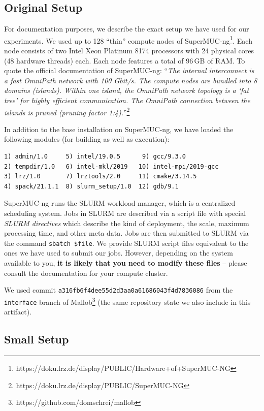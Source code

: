 \documentclass[runningheads]{article}
\numberwithin{dummy}{subsection}
\begin{document}
\subsection{Original Setup}

For documentation purposes, we describe the exact setup we have used for our experiments.
We used up to 128 ``thin'' compute nodes of SuperMUC-ng\footnote{https://doku.lrz.de/display/PUBLIC/Hardware+of+SuperMUC-NG}.
Each node consists of two Intel Xeon Platinum 8174 processors with 24 physical cores (48 hardware threads) each.
Each node features a total of 96\,GB of RAM.
To quote the official documentation of SuperMUC-ng: ``\textit{The internal interconnect is a fast OmniPath network with 100 Gbit/s.
The compute nodes are bundled into 8 domains (islands). Within one island, the OmniPath network topology is a `fat tree' for highly efficient communication. The OmniPath connection between the islands is pruned (pruning factor 1:4).}''\footnote{https://doku.lrz.de/display/PUBLIC/SuperMUC-NG}

In addition to the base installation on SuperMUC-ng, we have loaded the following modules (for building as well as execution):
{
\begin{verbatim}
1) admin/1.0     5) intel/19.0.5      9) gcc/9.3.0           
2) tempdir/1.0   6) intel-mkl/2019   10) intel-mpi/2019-gcc  
3) lrz/1.0       7) lrztools/2.0     11) cmake/3.14.5        
4) spack/21.1.1  8) slurm_setup/1.0  12) gdb/9.1    
\end{verbatim}
}

SuperMUC-ng runs the SLURM workload manager, which is a centralized scheduling system.
Jobs in SLURM are described via a script file with special \textit{SLURM directives} which describe the kind of deployment, the scale, maximum processing time, and other meta data.
Jobs are then submitted to SLURM via the command \texttt{sbatch \$file}.
We provide SLURM script files equivalent to the ones we have used to submit our jobs.
However, depending on the system available to you, \textbf{it is likely that you need to modify these files} -- please consult the documentation for your compute cluster.

We used commit \texttt{a316fb6f4dee55d2d3aa0a61686043f4d7836086} from the \texttt{interface} branch of Mallob\footnote{https://github.com/domschrei/mallob} (the same repository state we also include in this artifact).

\subsection{Small Setup}
\label{sec:small-setup}
\end{document}
